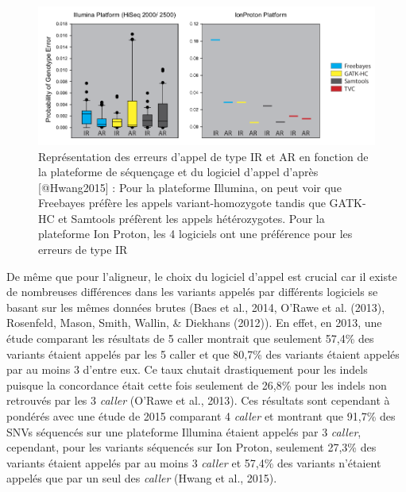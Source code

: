\documentclass[12pt,twoside]{reedthesis}
\theoremstyle{definition}
\theoremstyle{definition}
\theoremstyle{remark}
\begin{document}
  \begin{figure}
  
  {\centering \includegraphics[scale=.50]{figure/snp_error_type} 
  
  }
  
  \caption[Représentation des erreurs d'appel de type IR et AR en fonction de la plateforme de séquençage et du logiciel d'appel]{Représentation des erreurs d'appel de type IR et AR en fonction de la plateforme de séquençage et du logiciel d'appel d'après [@Hwang2015] : Pour la plateforme Illumina, on peut voir que Freebayes préfère les appels variant-homozygote tandis que GATK-HC et Samtools préfèrent les appels hétérozygotes. Pour la plateforme Ion Proton, les 4 logiciels ont une préférence pour les erreurs de type IR}\label{fig:snperror}
  \end{figure}
  
  De même que pour l'aligneur, le choix du logiciel d'appel est crucial
  car il existe de nombreuses différences dans les variants appelés par
  différents logiciels se basant sur les mêmes données brutes (Baes et
  al., 2014, O'Rawe et al. (2013), Rosenfeld, Mason, Smith, Wallin, \&
  Diekhans (2012)). En effet, en 2013, une étude comparant les résultats
  de 5 caller montrait que seulement 57,4\% des variants étaient appelés
  par les 5 caller et que 80,7\% des variants étaient appelés par au moins
  3 d'entre eux. Ce taux chutait drastiquement pour les indels puisque la
  concordance était cette fois seulement de 26,8\% pour les indels non
  retrouvés par les 3 \emph{caller} (O'Rawe et al., 2013). Ces résultats
  sont cependant à pondérés avec une étude de 2015 comparant 4
  \emph{caller} et montrant que 91,7\% des SNVs séquencés sur une
  plateforme Illumina étaient appelés par 3 \emph{caller}, cependant, pour
  les variants séquencés sur Ion Proton, seulement 27,3\% des variants
  étaient appelés par au moins 3 \emph{caller} et 57,4\% des variants
  n'étaient appelés que par un seul des \emph{caller} (Hwang et al.,
  2015).
  
\end{document}
